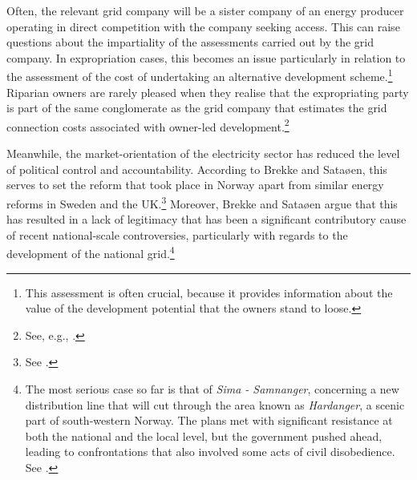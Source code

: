 Often, the relevant grid company will be a sister company of an energy producer operating in direct competition with the company seeking access. This can raise questions about the impartiality of the assessments carried out by the grid company. In expropriation cases, this becomes an issue particularly in relation to the assessment of the cost of undertaking an alternative development scheme.\footnote{This assessment is often crucial, because it provides information about the value of the development potential that the owners stand to loose.} Riparian owners are rarely pleased when they realise that the expropriating party is part of the same conglomerate as the grid company that estimates the grid connection costs associated with owner-led development.\footnote{See, e.g., \cite{smibelg15}.}

Meanwhile, the market-orientation of the electricity sector has reduced the level of political control and accountability. According to Brekke and Sataøen, this serves to set the reform that took place in Norway apart from similar energy reforms in Sweden and the UK.\footnote{See \cite{brekke12}.} Moreover, Brekke and Sataøen argue that this has resulted in a lack of legitimacy that has been a significant contributory cause of recent national-scale controversies, particularly with regards to the development of the national grid.\footnote{The most serious case so far is that of {\it Sima - Samnanger}, concerning a new distribution line that will cut through the area known as {\it Hardanger}, a scenic part of south-western Norway. The plans met with significant resistance at both the national and the local level, but the government pushed ahead, leading to confrontations that also involved some acts of civil disobedience. See \cite[22-23]{brekke12}.}

